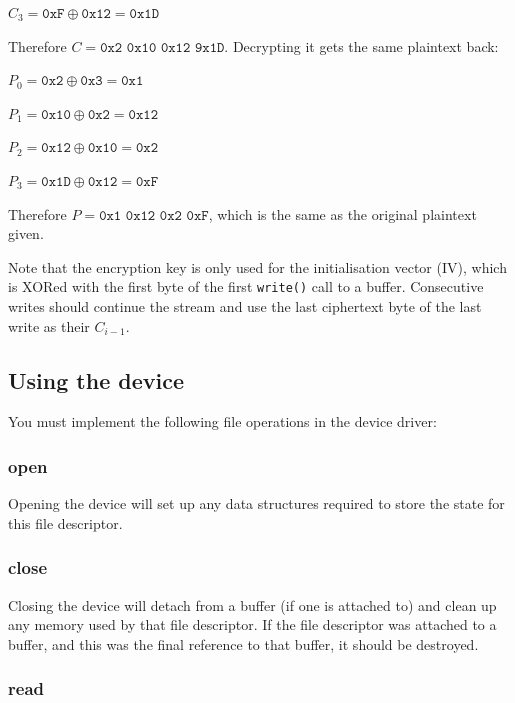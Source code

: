 \documentclass[12pt,a4paper]{article}
\begin{document}
$C_3 = \texttt{0xF} \oplus \texttt{0x12} = \texttt{0x1D}$

\vspace{0.5cm}

Therefore $C = \texttt{0x2 0x10 0x12 9x1D}$. Decrypting it gets the same
plaintext back:

\vspace{0.5cm}

$P_0 = \texttt{0x2} \oplus \texttt{0x3} = \texttt{0x1}$

$P_1 = \texttt{0x10} \oplus \texttt{0x2} = \texttt{0x12}$

$P_2 = \texttt{0x12} \oplus \texttt{0x10} = \texttt{0x2}$

$P_3 = \texttt{0x1D} \oplus \texttt{0x12} = \texttt{0xF}$

\vspace{0.5cm}

Therefore $P = \texttt{0x1 0x12 0x2 0xF}$, which is the same as the original
plaintext given.

Note that the encryption key is only used for the initialisation vector (IV),
which is XORed with the first byte of the first \texttt{write()} call to a
buffer. Consecutive writes should continue the stream and use the last
ciphertext byte of the last write as their $C_{i-1}$.

\subsection*{Using the device}

You must implement the following file operations in the device driver:

\subsubsection*{open}

Opening the device will set up any data structures required to store the state for
this file descriptor.

\subsubsection*{close}

Closing the device will detach from a buffer (if one is attached to) and clean
up any memory used by that file descriptor. If the file descriptor was attached
to a buffer, and this was the final reference to that buffer, it should be
destroyed.

\subsubsection*{read}
\end{document}
